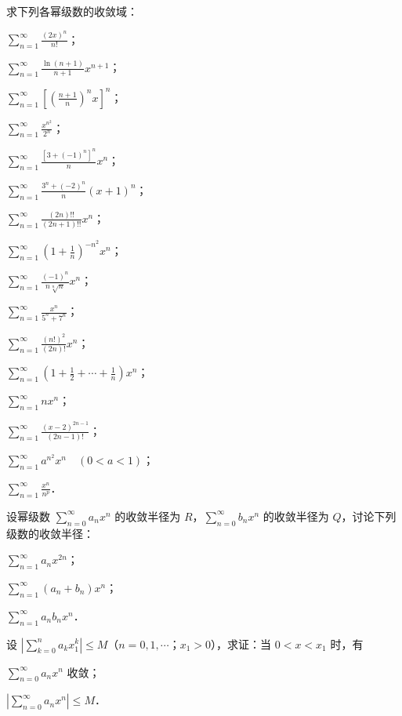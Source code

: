 \begin{xiti}
\item 求下列各幂级数的收敛域：
\begin{ziti}
\item $\displaystyle\sum_{n=1}^{\infty}\frac{(2x)^{n}}{n!}$；
\item $\displaystyle\sum_{n=1}^{\infty}\frac{\ln(n+1)}{n+1}x^{n+1}$；
\item $\displaystyle\sum_{n=1}^{\infty}\left[\left(\frac{n+1}{n}\right)^{n}x\right]^{n}$；
\item $\displaystyle\sum_{n=1}^{\infty}\frac{x^{n^{2}}}{2^{n}}$；
\item $\displaystyle\sum_{n=1}^{\infty}\frac{\left[3+(-1)^{n}\right]^{n}}{n}x^{n}$；
\item $\displaystyle\sum_{n=1}^{\infty}\frac{3^{n}+(-2)^{n}}{n}(x+1)^{n}$；
\item $\displaystyle\sum_{n=1}^{\infty}\frac{(2n)!!}{(2n+1)!!}x^{n}$；
\item $\displaystyle\sum_{n=1}^{\infty}\left(1+\frac{1}{n}\right)^{-n^{2}}x^{n}$；
\item $\displaystyle\sum_{n=1}^{\infty}\frac{(-1)^{n}}{n\sqrt[n]{n}}x^{n}$；
\item $\displaystyle\sum_{n=1}^{\infty}\frac{x^{n}}{5^{n}+7^{n}}$；
\item $\displaystyle\sum_{n=1}^{\infty}\frac{(n!)^{2}}{(2n)!}x^{n}$；
\item $\displaystyle\sum_{n=1}^{\infty}\left(1+\frac{1}{2}+\cdots+\frac{1}{n}\right)x^{n}$；
\item $\displaystyle\sum_{n=1}^{\infty}nx^{n}$；
\item $\displaystyle\sum_{n=1}^{\infty}\frac{(x-2)^{2n-1}}{(2n-1)!}$；
\item $\displaystyle\sum_{n=1}^{\infty}a^{n^{2}}x^{n}\quad(0<a<1)$；
\item $\displaystyle\sum_{n=1}^{\infty}\frac{x^{n}}{n^{p}}$．
\end{ziti}
\item 设幂级数 $\displaystyle\sum_{n=0}^{\infty}a_{n}x^{n}$ 的收敛半径为 $R$，$\displaystyle\sum_{n=0}^{\infty}b_{n}x^{n}$ 的收敛半径为 $Q$，讨论下列级数的收敛半径：
\begin{ziti}
\item $\displaystyle\sum_{n=1}^{\infty}a_{n}x^{2n}$；
\item $\displaystyle\sum_{n=1}^{\infty}\left(a_{n}+b_{n}\right)x^{n}$；
\item $\displaystyle\sum_{n=1}^{\infty}a_{n}b_{n}x^{n}$．
\end{ziti}
\item 设 $\displaystyle\left|\sum_{k=0}^{n}a_{k}x_{1}^{k}\right|\leqslant M$（$n=0,1,\cdots$；$x_{1}>0$），求证：当 $0<x<x_{1}$ 时，有
\begin{ziti}
\item $\displaystyle\sum_{n=0}^{\infty}a_{n}x^{n}$ 收敛；
\item $\displaystyle\left|\sum_{n=0}^{\infty}a_{n}x^{n}\right|\leqslant M$．
\end{ziti}
\end{xiti}

